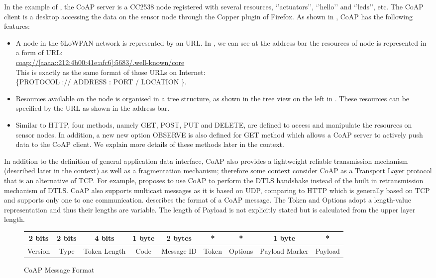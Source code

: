 In the example of , the CoAP server is a CC2538 node registered with several resources, ‘’actuators’’, ‘’hello’’ and ‘’leds’’, etc. The CoAP client is a desktop accessing the data on the sensor node through the Copper plugin\cite{Copper} of Firefox. As shown in , CoAP has the following features:
\begin{itemize}
	\item A node in the 6LoWPAN network is represented by an URL. In , we can see at the address bar the resources of node is represented in a form of URL:\\
	\url{coap://[aaaa::212:4b00:41e:afc6]:5683/.well-known/core} \\
	This is exactly as the same format of those URLs on Internet: \\
	 \{PROTOCOL :// ADDRESS : PORT / LOCATION \}.
	 \item Resources available on the node is organised in a tree structure, as shown in the tree view on the left in . These resources can be specified by the URL as shown in the address bar.
	 \item Similar to HTTP, four methods, namely GET, POST, PUT and DELETE, are defined to access and manipulate the resources on sensor nodes. In addition, a new new option OBSERVE is also defined for GET method which allows a CoAP server to actively push data to the CoAP client. We explain more details of these methods later in the context.
\end{itemize}
In addition to the definition of general application data interface, CoAP also provides a lightweight reliable transmission mechanism (described later in the context) as well as a fragmentation mechanism\cite{CoapBlock}; therefore some context consider CoAP as a Transport Layer protocol that is an alternative of TCP. For example, \cite{CoDTLS} proposes to use CoAP to perform the DTLS handshake instead of the built in retransmission mechanism of DTLS. CoAP also supports multicast messages as it is based on UDP, comparing to HTTP which is generally based on TCP and supports only one to one communication.
 describes the format of a CoAP message. The Token and Options adopt a length-value representation and thus their lengths are variable. The length of Payload is not explicitly stated but is calculated from the upper layer length.
\begin{figure}[h!]
	\center
	\begin{tabular}{|c|c|c|c|c|c|c|c|c|}
	\hline
	2 bits  & 2 bits & 4 bits       & 1 byte & 2 bytes   & * & *       & 1 byte    & *       \\ \hline
	Version & Type   & Token Length & Code   & Message ID & Token                 & Options & Payload Marker & Payload \\ \hline
	\end{tabular}
	\caption{CoAP Message Format}
	\label{Fig: CoAP Message Format}
\end{figure}

